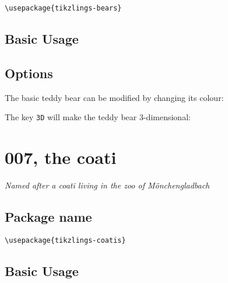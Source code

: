 \documentclass[parskip=half]{scrartcl}
\begin{document}
\begin{tcolorbox}[lower separated=false, lefthand width=.8\linewidth]
\vspace*{0.5cm}
\lstinline|\usepackage{tikzlings-bears}| 
\vspace*{0.5cm}
\end{tcolorbox}

\subsection{Basic Usage}

\begin{tcblisting}{}
\bear
\end{tcblisting}

\subsection{Options}

The basic teddy bear can be modified by changing its colour:
\begin{tcblisting}{}
\bear[body=blue]
\end{tcblisting}

The key \lstinline|3D| will make the teddy bear 3-dimensional:
\begin{tcblisting}{}
\bear[3D]
\end{tcblisting}

%
%
\clearpage
\section[Coati]{007, the coati}

\emph{Named after a coati living in the zoo of M\"onchengladbach}

\subsection{Package name}

\begin{tcolorbox}[lower separated=false, lefthand width=.8\linewidth]
\vspace*{0.5cm}
\lstinline|\usepackage{tikzlings-coatis}| 
\vspace*{0.5cm}
\end{tcolorbox}

\subsection{Basic Usage}
\end{document}
